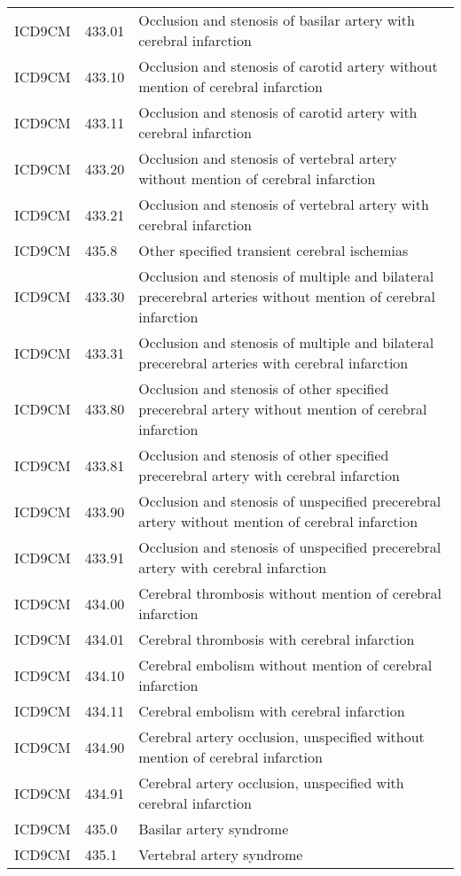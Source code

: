 \begin{longtable}{p{}p{}p{}}
  ICD9CM & 433.01 & Occlusion and stenosis of basilar artery with cerebral infarction \\ 
  ICD9CM & 433.10 & Occlusion and stenosis of carotid artery without mention of cerebral infarction \\ 
  ICD9CM & 433.11 & Occlusion and stenosis of carotid artery with cerebral infarction \\ 
  ICD9CM & 433.20 & Occlusion and stenosis of vertebral artery without mention of cerebral infarction \\ 
  ICD9CM & 433.21 & Occlusion and stenosis of vertebral artery with cerebral infarction \\ 
  ICD9CM & 435.8 & Other specified transient cerebral ischemias \\ 
  ICD9CM & 433.30 & Occlusion and stenosis of multiple and bilateral precerebral arteries without mention of cerebral infarction \\ 
  ICD9CM & 433.31 & Occlusion and stenosis of multiple and bilateral precerebral arteries with cerebral infarction \\ 
  ICD9CM & 433.80 & Occlusion and stenosis of other specified precerebral artery without mention of cerebral infarction \\ 
  ICD9CM & 433.81 & Occlusion and stenosis of other specified precerebral artery with cerebral infarction \\ 
  ICD9CM & 433.90 & Occlusion and stenosis of unspecified precerebral artery without mention of cerebral infarction \\ 
  ICD9CM & 433.91 & Occlusion and stenosis of unspecified precerebral artery with cerebral infarction \\ 
  ICD9CM & 434.00 & Cerebral thrombosis without mention of cerebral infarction \\ 
  ICD9CM & 434.01 & Cerebral thrombosis with cerebral infarction \\ 
  ICD9CM & 434.10 & Cerebral embolism without mention of cerebral infarction \\ 
  ICD9CM & 434.11 & Cerebral embolism with cerebral infarction \\ 
  ICD9CM & 434.90 & Cerebral artery occlusion, unspecified without mention of cerebral infarction \\ 
  ICD9CM & 434.91 & Cerebral artery occlusion, unspecified with cerebral infarction \\ 
  ICD9CM & 435.0 & Basilar artery syndrome \\ 
  ICD9CM & 435.1 & Vertebral artery syndrome \\ 

\end{longtable}
